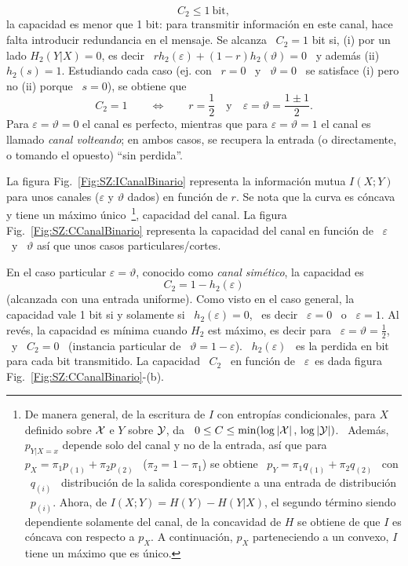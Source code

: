 %
\[
C_2 \le 1 \: \mbox{bit},
\]
%
\ie  la capacidad  es menor  que 1  bit: para  transmitir informaci\'on  en este
canal, hace falta introducir redundancia en  el mensaje.  Se alcanza \ $C_2 = 1$
bit si, (i) por  un lado $H_2(Y|X) = 0$, es decir  \ $r h_2(\varepsilon) + (1-r)
h_2(\vartheta) = 0$ \ y adem\'as (ii) \ $h_2(s) = 1$.  Estudiando cada caso (ej.
con \ $r = 0$ \ y \ $\vartheta =  0$ \ se satisface (i) pero no (ii) porque \ $s
= 0$), se obtiene que
%
\[
C_2  =  1  \qquad  \Leftrightarrow  \qquad  r =  \frac12  \quad  \mbox{y}  \quad
\varepsilon = \vartheta = \frac{1 \pm 1}{2}.
\]
%
Para  $\varepsilon =  \vartheta =  0$ el  canal es  perfecto, mientras  que para
$\varepsilon =  \vartheta =  1$ el  canal es llamado  {\it canal  volteando}; en
ambos casos, se recupera la entrada (o directamente, o tomando el opuesto) ``sin
perdida''.

La  figura  Fig.~\ref{Fig:SZ:ICanalBinario}  representa la  informaci\'on  mutua
$I(X;Y)$ para unos  canales ($\varepsilon$ y $\vartheta$ dados)  en funci\'on de
$r$.  Se nota que la curva es c\'oncava y tiene un m\'aximo \'unico~\footnote{De
  manera general, de la escritura de $I$ con entrop\'ias condicionales, para $X$
  definido sobre $\mathcal{X}$ e  $Y$ sobre $\mathcal{Y}$, da \ $0 \le C \le  \min( \log |\mathcal{X}| \, ,
  \, \log |\mathcal{Y}|  )$.  \ Adem\'as, $p_{Y|X=x}$  depende solo del canal y  no de la
  entrada, as\'i que  para \ $p_X =  \pi_1 p_{(1)} + \pi_2 p_{(2)}$  \ ($\pi_2 =
  1-\pi_1$) se obtiene \ $p_Y = \pi_1 q_{(1)} + \pi_2 q_{(2)}$ \ con \ $q_{(i)}$
  \ distribuci\'on de la salida corespondiente a una entrada de distribuci\'on \
  $p_{(i)}$.   Ahora, de  $I(X;Y) =  H(Y)-H(Y|X)$, el  segundo  t\'ermino siendo
  dependiente solamente del canal, de la concavidad de $H$ se obtiene de que $I$
  es c\'oncava con respecto a  $p_X$.  A continuaci\'on, $p_X$ parteneciendo a un
  convexo,  $I$ tiene un  m\'aximo que  es \'unico.},  capacidad del  canal.  La
figura  Fig.~\ref{Fig:SZ:CCanalBinario}  representa la  capacidad  del canal  en
funci\'on  de  \   $\varepsilon$  \  y  \  $\vartheta$   as\'i  que  unos  casos
particulares/cortes.

En  el caso  particular  $\varepsilon  = \vartheta$,  conocido  como {\it  canal
  sim\'etico}, la capacidad es
%
\[
C_2 = 1 - h_2(\varepsilon)
\]
%
(alcanzada  con  una entrada  uniforme).   Como visto  en  el  caso general,  la
capacidad vale 1  bit si y solamente si  \ $h_2(\varepsilon) = 0$, \  es decir \
$\varepsilon = 0$ \ o \ $\varepsilon = 1$.  Al rev\'es, la capacidad es m\'inima
cuando $H_2$ est m\'aximo, es decir  para \ $\varepsilon = \vartheta = \frac12$,
\ y  \ $C_2 = 0$  \ (instancia particular  de \ $\vartheta =  1-\varepsilon$). \
$h_2(\varepsilon)$  \  es la  perdida  en bit  para  cada  bit transmitido.   La
capacidad  \  $C_2$   \  en  funci\'on  de  \   $\varepsilon$\  es  dada  figura
Fig.~\ref{Fig:SZ:CCanalBinario}-(b).

